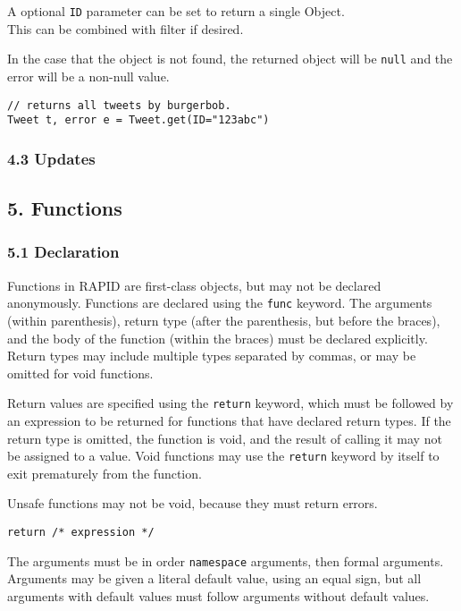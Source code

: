 \documentclass[]{article}
\begin{document}
A optional \texttt{ID} parameter can be set to return a single
Object.\\This can be combined with filter if desired.

In the case that the object is not found, the returned object will be
\texttt{null} and the error will be a non-null value.

\begin{verbatim}
// returns all tweets by burgerbob.
Tweet t, error e = Tweet.get(ID="123abc")
\end{verbatim}

\subsubsection{4.3 Updates}\label{updates}

\subsection{5. Functions}\label{functions-1}

\subsubsection{5.1 Declaration}\label{declaration}

Functions in RAPID are first-class objects, but may not be declared
anonymously. Functions are declared using the \texttt{func} keyword. The
arguments (within parenthesis), return type (after the parenthesis, but
before the braces), and the body of the function (within the braces)
must be declared explicitly. Return types may include multiple types
separated by commas, or may be omitted for void functions.

Return values are specified using the \texttt{return} keyword, which
must be followed by an expression to be returned for functions that have
declared return types. If the return type is omitted, the function is
void, and the result of calling it may not be assigned to a value. Void
functions may use the \texttt{return} keyword by itself to exit
prematurely from the function.

Unsafe functions may not be void, because they must return errors.

\begin{verbatim}
return /* expression */
\end{verbatim}

The arguments must be in order \texttt{namespace} arguments, then formal
arguments. Arguments may be given a literal default value, using an
equal sign, but all arguments with default values must follow arguments
without default values.
\end{document}
